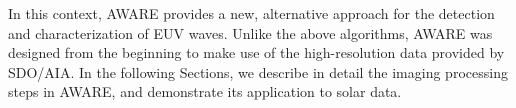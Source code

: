 In this context, AWARE provides a new, alternative approach for the detection and characterization of EUV waves. Unlike the above algorithms, AWARE was designed from the beginning to make use of the high-resolution data provided by SDO/AIA. In the following Sections, we describe in detail the imaging processing steps in AWARE, and demonstrate its application to solar data.
